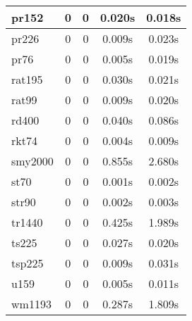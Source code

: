 \begin{longtable}{|l||c|c|c|c|}
  \hline
  pr152 & 0 & 0 & 0.020s & 0.018s \\
  \hline
  pr226 & 0 & 0 & 0.009s & 0.023s \\
  \hline
  pr76 & 0 & 0 & 0.005s & 0.019s \\
  \hline
  rat195 & 0 & 0 & 0.030s & 0.021s \\
  \hline
  rat99 & 0 & 0 & 0.009s & 0.020s \\
  \hline
  rd400 & 0 & 0 & 0.040s & 0.086s \\
  \hline
  rkt74 & 0 & 0 & 0.004s & 0.009s \\
  \hline
  smy2000 & 0 & 0 & 0.855s & 2.680s \\
  \hline
  st70 & 0 & 0 & 0.001s & 0.002s \\
  \hline
  str90 & 0 & 0 & 0.002s & 0.003s \\
  \hline
  tr1440 & 0 & 0 & 0.425s & 1.989s \\
  \hline
  ts225 & 0 & 0 & 0.027s & 0.020s \\
  \hline
  tsp225 & 0 & 0 & 0.009s & 0.031s \\
  \hline
  u159 & 0 & 0 & 0.005s & 0.011s \\
  \hline
  wm1193 & 0 & 0 & 0.287s & 1.809s \\
  \hline
\end{longtable}